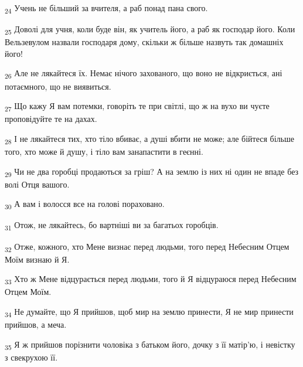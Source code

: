 \begin{tcolorbox}
\textsubscript{24} Учень не більший за вчителя, а раб понад пана свого.
\end{tcolorbox}
\begin{tcolorbox}
\textsubscript{25} Доволі для учня, коли буде він, як учитель його, а раб як господар його. Коли Вельзевулом назвали господаря дому, скільки ж більше назвуть так домашніх його!
\end{tcolorbox}
\begin{tcolorbox}
\textsubscript{26} Але не лякайтеся їх. Немає нічого захованого, що воно не відкриється, ані потаємного, що не виявиться.
\end{tcolorbox}
\begin{tcolorbox}
\textsubscript{27} Що кажу Я вам потемки, говоріть те при світлі, що ж на вухо ви чуєте проповідуйте те на дахах.
\end{tcolorbox}
\begin{tcolorbox}
\textsubscript{28} І не лякайтеся тих, хто тіло вбиває, а душі вбити не може; але бійтеся більше того, хто може й душу, і тіло вам занапастити в геєнні.
\end{tcolorbox}
\begin{tcolorbox}
\textsubscript{29} Чи не два горобці продаються за гріш? А на землю із них ні один не впаде без волі Отця вашого.
\end{tcolorbox}
\begin{tcolorbox}
\textsubscript{30} А вам і волосся все на голові пораховано.
\end{tcolorbox}
\begin{tcolorbox}
\textsubscript{31} Отож, не лякайтесь, бо вартніші ви за багатьох горобців.
\end{tcolorbox}
\begin{tcolorbox}
\textsubscript{32} Отже, кожного, хто Мене визнає перед людьми, того перед Небесним Отцем Моїм визнаю й Я.
\end{tcolorbox}
\begin{tcolorbox}
\textsubscript{33} Хто ж Мене відцурається перед людьми, того й Я відцураюся перед Небесним Отцем Моїм.
\end{tcolorbox}
\begin{tcolorbox}
\textsubscript{34} Не думайте, що Я прийшов, щоб мир на землю принести, Я не мир принести прийшов, а меча.
\end{tcolorbox}
\begin{tcolorbox}
\textsubscript{35} Я ж прийшов порізнити чоловіка з батьком його, дочку з її матір'ю, і невістку з свекрухою її.
\end{tcolorbox}
